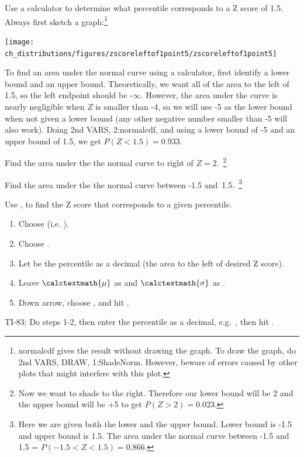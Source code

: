 \begin{example}{Use a calculator to determine what percentile corresponds to a Z score of 1.5.}
Always first sketch a graph:\footnote{normalcdf gives the result without drawing the graph. To draw the graph, do 2nd VARS, DRAW, 1:ShadeNorm. However, beware of errors caused by other plots that might interfere with this plot.}
\begin{center}
\texttt{[image: ch\_distributions/figures/zscoreleftof1point5/zscoreleftof1point5]}\vspace{-2mm}
\end{center}
To find an area under the normal curve using a calculator, first identify a lower bound and an upper bound. Theoretically, we want all of the area to the left of 1.5, so the left endpoint should be -$\infty$. However, the area under the curve is nearly negligible when $Z$ is smaller than -4, so we will use -5 as the lower bound when not given a lower bound (any other negative number smaller than -5 will also work).  Doing 2nd VARS, 2:normalcdf, and using a lower bound of -5 and an upper bound of 1.5, we get $P(Z < 1.5) = 0.933$.
\end{example}

\begin{exercise}
Find the area under the the normal curve to right of $Z=2$.~\footnote{Now we want to shade to the right. Therefore our lower bound will be 2 and the upper bound will be +5 to get $P(Z > 2) = 0.023$.}
\end{exercise}

\begin{exercise}Find the area under the the normal curve between -1.5 and~1.5.~\footnote{Here we are given both the lower and the upper bound. Lower bound is -1.5 and upper bound is 1.5. The area under the normal curve between -1.5 and 1.5 = $P(-1.5 < Z < 1.5) = 0.866$.}
\end{exercise}

\begin{termBox}{
Use  ,  to find the Z score that corresponds to a given percentile.
\begin{enumerate}
\setlength{\itemsep}{0mm}
\item Choose   (i.e. ).
\item Choose .
\item Let  be the percentile as a decimal (the area to the left of desired Z score).
\item Leave $\calctextmath{\mu}$ as  and $\calctextmath{\sigma}$ as .
\item Down arrow, choose , and hit .\vspace{-1.5mm}
\end{enumerate}
TI-83: Do steps 1-2, then enter the percentile as a decimal, e.g.~\mbox{,} then hit .}
\end{termBox}


